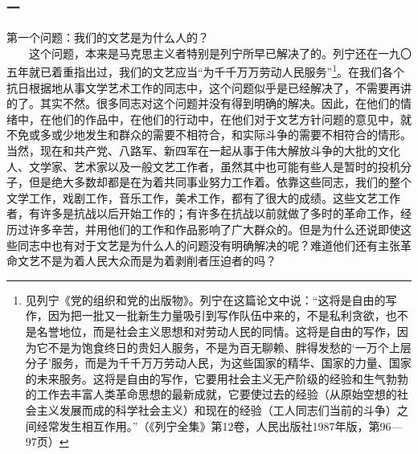 \documentclass[cn,11pt,chinese]{elegantbook}
\def\myformat#1{\hfil\hfil #1}
\begin{document}
\subsubsection*{\myformat{一}}
第一个问题：我们的文艺是为什么人的？\\
　　这个问题，本来是马克思主义者特别是列宁所早已解决了的。列宁还在一九〇五年就已着重指出过，我们的文艺应当“为千千万万劳动人民服务”\footnote[2]{ 见列宁《党的组织和党的出版物》。列宁在这篇论文中说：“这将是自由的写作，因为把一批又一批新生力量吸引到写作队伍中来的，不是私利贪欲，也不是名誉地位，而是社会主义思想和对劳动人民的同情。这将是自由的写作，因为它不是为饱食终日的贵妇人服务，不是为百无聊赖、胖得发愁的‘一万个上层分子’服务，而是为千千万万劳动人民，为这些国家的精华、国家的力量、国家的未来服务。这将是自由的写作，它要用社会主义无产阶级的经验和生气勃勃的工作去丰富人类革命思想的最新成就，它要使过去的经验（从原始空想的社会主义发展而成的科学社会主义）和现在的经验（工人同志们当前的斗争）之间经常发生相互作用。”（《列宁全集》第12卷，人民出版社1987年版，第96—97页）}。在我们各个抗日根据地从事文学艺术工作的同志中，这个问题似乎是已经解决了，不需要再讲的了。其实不然。很多同志对这个问题并没有得到明确的解决。因此，在他们的情绪中，在他们的作品中，在他们的行动中，在他们对于文艺方针问题的意见中，就不免或多或少地发生和群众的需要不相符合，和实际斗争的需要不相符合的情形。当然，现在和共产党、八路军、新四军在一起从事于伟大解放斗争的大批的文化人、文学家、艺术家以及一般文艺工作者，虽然其中也可能有些人是暂时的投机分子，但是绝大多数却都是在为着共同事业努力工作着。依靠这些同志，我们的整个文学工作，戏剧工作，音乐工作，美术工作，都有了很大的成绩。这些文艺工作者，有许多是抗战以后开始工作的；有许多在抗战以前就做了多时的革命工作，经历过许多辛苦，并用他们的工作和作品影响了广大群众的。但是为什么还说即使这些同志中也有对于文艺是为什么人的问题没有明确解决的呢？难道他们还有主张革命文艺不是为着人民大众而是为着剥削者压迫者的吗？\\
\end{document}
